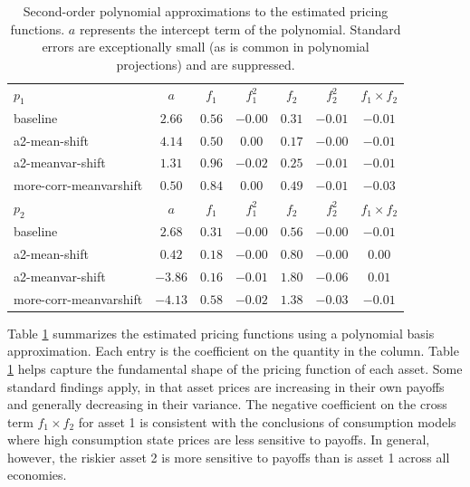 \documentclass{article}
\begin{document}
\begin{table}
    \caption{Second-order polynomial approximations to the estimated pricing functions. $a$ represents the intercept term of the polynomial. Standard errors are exceptionally small (as is common in polynomial projections) and are suppressed.}
    \label{tab:poly}
    \begin{tabular}{lcccccc}
        \toprule
        $p_1$ &          $a$ &        $f_1$ &      $f_1^2$ &        $f_2$ &      $f_2^2$ & $f_1\times f_2$\\
     baseline & $        2.66$ & $        0.56$ & $       -0.00$ & $        0.31$ & $       -0.01$ & $       -0.01$\\
a2-mean-shift & $        4.14$ & $        0.50$ & $        0.00$ & $        0.17$ & $       -0.00$ & $       -0.01$\\
a2-meanvar-shift & $        1.31$ & $        0.96$ & $       -0.02$ & $        0.25$ & $       -0.01$ & $       -0.01$\\
more-corr-meanvarshift & $        0.50$ & $        0.84$ & $        0.00$ & $        0.49$ & $       -0.01$ & $       -0.03$\\
\midrule
        $p_2$ &          $a$ &        $f_1$ &      $f_1^2$ &        $f_2$ &      $f_2^2$ & $f_1\times f_2$\\
     baseline & $        2.68$ & $        0.31$ & $       -0.00$ & $        0.56$ & $       -0.00$ & $       -0.01$\\
a2-mean-shift & $        0.42$ & $        0.18$ & $       -0.00$ & $        0.80$ & $       -0.00$ & $        0.00$\\
a2-meanvar-shift & $       -3.86$ & $        0.16$ & $       -0.01$ & $        1.80$ & $       -0.06$ & $        0.01$\\
more-corr-meanvarshift & $       -4.13$ & $        0.58$ & $       -0.02$ & $        1.38$ & $       -0.03$ & $       -0.01$\\
\bottomrule
    \end{tabular}
\end{table}

Table \ref{tab:poly} summarizes the estimated pricing functions using a polynomial basis approximation. Each entry is the coefficient on the quantity in the column. Table \ref{tab:poly} helps capture the fundamental shape of the pricing function of each asset. Some standard findings apply, in that asset prices are increasing in their own payoffs and generally decreasing in their variance. The negative coefficient on the cross term $f_1 \times f_2$ for asset 1 is consistent with the conclusions of consumption models where high consumption state prices are less sensitive to payoffs. In general, however, the riskier asset 2 is more sensitive to payoffs than is asset 1 across all economies.
\end{document}
